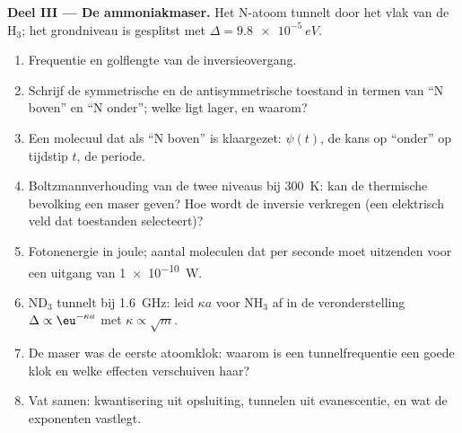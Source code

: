 \begin{problem}
\textbf{Deel III --- De ammoniakmaser.}
Het N-atoom tunnelt door het vlak van de H$_3$; het grondniveau is gesplitst
met $\Delta = \qty{9.8e-5}{eV}$.
\begin{enumerate}[resume]
  \item Frequentie en golflengte van de inversieovergang.
  \item Schrijf de symmetrische en de antisymmetrische toestand in termen van
        ``N boven'' en ``N onder''; welke ligt lager, en waarom?
  \item Een molecuul dat als ``N boven'' is klaargezet: $\psi(t)$, de kans op
        ``onder'' op tijdstip $t$, de periode.
  \item Boltzmannverhouding van de twee niveaus bij \qty{300}{K}: kan de
        thermische bevolking een maser geven? Hoe wordt de inversie verkregen
        (een elektrisch veld dat toestanden selecteert)?
  \item Fotonenergie in joule; aantal moleculen dat per seconde moet uitzenden
        voor een uitgang van \qty{1e-10}{W}.
  \item ND$_3$ tunnelt bij \qty{1.6}{GHz}: leid $\kappa a$ voor NH$_3$ af
        in de veronderstelling $\Delta \propto \eu^{-\kappa a}$ met
        $\kappa \propto \sqrt{m}$.
  \item De maser was de eerste atoomklok: waarom is een tunnelfrequentie
        een goede klok en welke effecten verschuiven haar?
  \item Vat samen: kwantisering uit opsluiting, tunnelen uit
        evanescentie, en wat de exponenten vastlegt.
\end{enumerate}
\end{problem}
